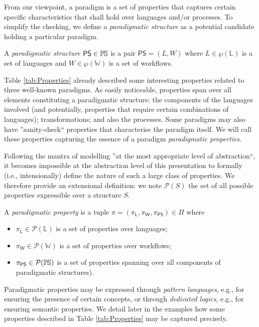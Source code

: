 From our viewpoint, a paradigm is a set of properties that captures 
certain specific characteristics that shall hold over languages and/or 
processes. To simplify the checking, we define a \emph{paradigmatic structure} 
as a potential candidate holding a particular paradigm.


\begin{Definition}
   A \emph{paradigmatic structure} $\mathsf{PS}\in \mathbb{P}\mskip-1mu\mathbb{S}$ is a pair $\mathsf{PS} 
= (L, W)$ where $L\in \wp(\mathbb{L})$ is a set of languages and 
$W \in \wp(\mathbb{W})$ is a set of workflows.
\end{Definition}

Table \ref{tab:Properties} already described some interesting properties 
related to three well-known paradigms. As easily noticeable, properties span 
over all elements constituting a paradigmatic structure: the components of the 
languages involved (and potentially, properties that require certain 
combinations of languages); transformations; and also the processes. Some 
paradigms may also have ''sanity-check`` properties that characterise the 
paradigm itself. We will call these properties capturing the essence of a 
paradigm \emph{paradigmatic properties}.

Following the mantra of modelling ''at the most appropriate 
level of abstraction``, it becomes impossible at the abstraction level of this 
presentation to formally (i.e., intensionally) define the nature of such a large 
class of properties. We therefore provide an extensional definition: we note 
$\mathcal{P}(S)$ the set of all possible properties expressible over a 
structure $S$. 


\begin{Definition}
   A \emph{paradigmatic property} is a tuple
$\pi = (\pi_{\mathsf{L}},\pi_{\mathsf{W}},\pi_{\mathsf{PS}}) \in \Pi$ where
\begin{itemize}
   \item $\pi_{\mathsf{L}} \in \mathcal{P}(\mathbb{L})$ is a set of properties 
over languages;
   \item $\pi_{\mathsf{W}} \in \mathcal{P}(\mathbb{W})$ is a set of properties 
over workflows;
   \item $\pi_{\mathsf{PS}}\in\mathcal{P}(\mathbb{P}\mskip-1mu\mathbb{S})$ is a set of 
properties spanning over all components of paradigmatic structures).
\end{itemize}
\end{Definition}
\noindent
Paradigmatic properties may be expressed through \emph{pattern languages}, e.g., 
for ensuring the presence of certain concepts, or through \emph{dedicated 
logics}, e.g., for ensuring semantic properties. We detail later in the examples 
how some properties described in Table \ref{tab:Properties} may be captured 
precisely.


